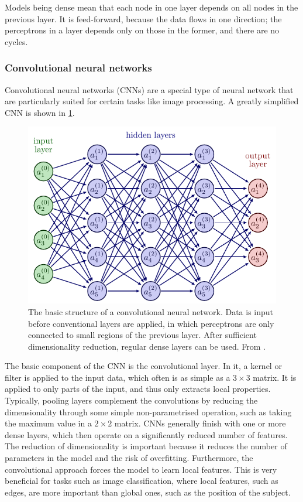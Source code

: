 Models being dense mean that each node in one layer depends on all nodes in the previous layer.
It is feed-forward, because the data flows in one direction; the perceptrons in a layer depends only on those in the former, and there are no cycles.

\subsubsection{Convolutional neural networks}
\label{sec:cnn}
Convolutional neural networks (CNNs) are a special type of neural network that are particularly suited for certain tasks like image processing.
A greatly simplified CNN is shown in \cref{fig:cnn}.

\begin{figure}
    \centering
    \includegraphics[width=0.85\linewidth, page=7]{neural_networks.pdf}
    \caption[
        The basic structure of a convolutional neural network.
    ]
    {
        The basic structure of a convolutional neural network.
        Data is input before conventional layers are applied, in which perceptrons are only connected to small regions of the previous layer.
        After sufficient dimensionality reduction, regular dense layers can be used.
        From \cite{nn_figs}.
    }
    \label{fig:cnn}
\end{figure}

The basic component of the CNN is the convolutional layer.
In it, a kernel or filter is applied to the input data, which often is as simple as a $3 \times 3$ matrix.
It is applied to only parts of the input, and thus only extracts local properties.
Typically, pooling layers complement the convolutions by reducing the dimensionality through some simple non-parametrised operation, such as taking the maximum value in a $2 \times 2$ matrix.
CNNs generally finish with one or more dense layers, which then operate on a significantly reduced number of features.
The reduction of dimensionality is important because it reduces the number of parameters in the model and the risk of overfitting.
Furthermore, the convolutional approach forces the model to learn local features.
This is very beneficial for tasks such as image classification, where local features, such as edges, are more important than global ones, such as the position of the subject.

